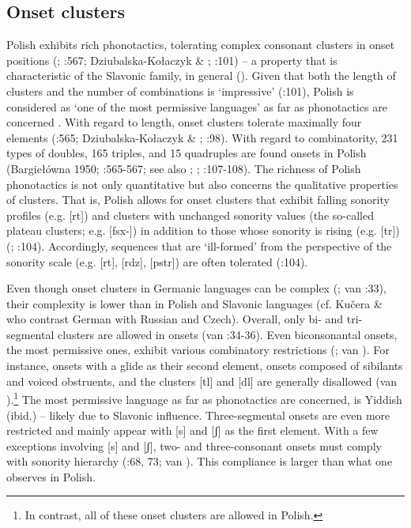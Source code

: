 \documentclass[output=paper]{langscibook}
\begin{document}
\subsection{Onset clusters}\label{sec:wymsorys:4.7}

Polish exhibits rich phonotactics, tolerating complex consonant clusters in onset positions (\citealt{Gussmann2007}; \citealt{Zydorowicz2010}:567; Dziubalska-Kołaczyk \& \citealt{Zydorowicz2014}; \citealt{ZydorowiczOrzechowska2017}:101) – a property that is characteristic of the Slavonic family, in general (\citealt{SussexCubberley2006}). Given that both the length of clusters and the number of combinations is ‘impressive’ (\citealt{ZydorowiczOrzechowska2017}:101), Polish is considered as ‘one of the most permissive languages’ as far as phonotactics are concerned \citep[62]{Kijak2008}. With regard to length, onset clusters tolerate maximally four elements (\citealt{Zydorowicz2010}:565; Dziubalska-Kołaczyk \& \citealt{Zydorowicz2014}; \citealt{ZydorowiczOrzechowska2017}:98). With regard to combinatority, 231 types of doubles, 165 triples, and 15 quadruples are found onsets in Polish (Bargiełówna 1950; \citealt{Zydorowicz2010}:565-567; see also \citealt{Dukiewicz1980}; \citealt{Dobrogowska1984,Dobrogowska1990,Dobrogowska1992}; \citealt{ZydorowiczOrzechowska2017}:107-108). The richness of Polish phonotactics is not only quantitative but also concerns the qualitative properties of clusters. That is, Polish allows for onset clusters that exhibit falling sonority profiles (e.g. [rt]) and clusters with unchanged sonority values (the so-called plateau clusters; e.g. [fsx\nobreakdash-]) in addition to those whose sonority is rising (e.g. [tr]) (\citealt{Dukiewicz1980}; \citealt{ZydorowiczOrzechowska2017}:104). Accordingly, sequences that are ‘ill-formed’ from the perspective of the sonority scale (e.g. [rt], [rdz], [pstr]) are often tolerated (\citealt{ZydorowiczOrzechowska2017}:104).

Even though onset clusters in Germanic languages can be complex (\citealt{Harbert2007}; van \citealt{Oostendorp2020}:33), their complexity is lower than in Polish and Slavonic languages (cf. Kučera \& \citealt{Monroe1968} who contrast German with Russian and Czech). Overall, only bi- and tri-segmental clusters are allowed in onsets (van \citealt{Oostendorp2020}:34-36). Even biconsonantal onsets, the most permissive ones, exhibit various combinatory restrictions (\citealt{Harbert2007}; van \citealt{Oostendorp2020}). For instance, onsets with a glide as their second element, onsets composed of sibilants and voiced obstruents, and the clusters [tl] and [dl] are generally disallowed (van \citealt{Oostendorp2020}).\footnote{In contrast, all of these onset clusters are allowed in Polish.} The most permissive language as far as phonotactics are concerned, is Yiddish (ibid.) – likely due to Slavonic influence. Three-segmental onsets are even more restricted and mainly appear with [s] and [ʃ] as the first element. With a few exceptions involving [s] and [ʃ], two- and three-consonant onsets must comply with sonority hierarchy (\citealt{Harbert2007}:68, 73; van \citealt{Oostendorp2020}). This compliance is larger than what one observes in Polish.
\end{document}
